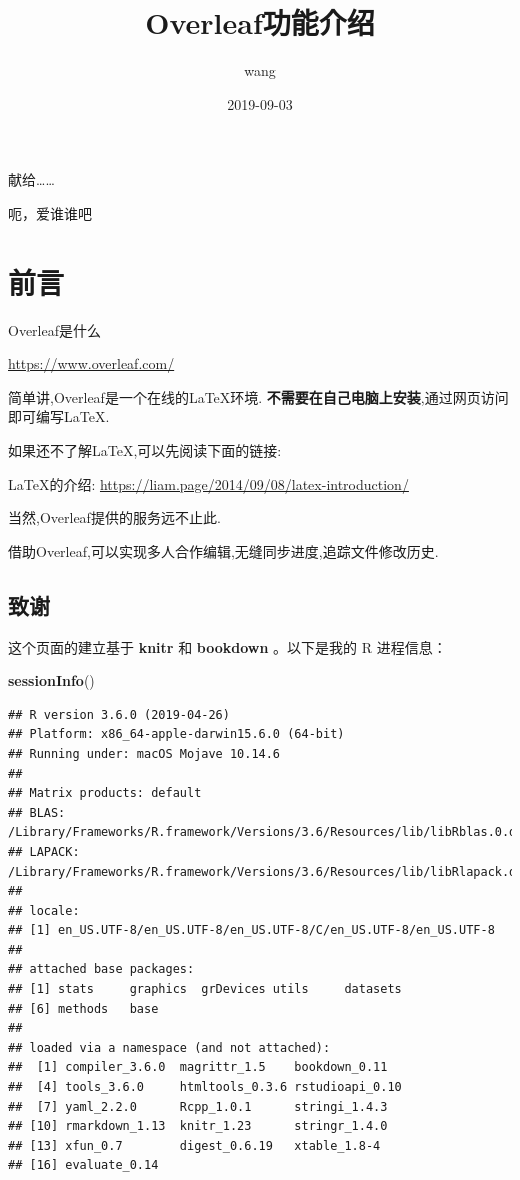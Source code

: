 \documentclass[]{ctexbook}
\title{Overleaf功能介绍}
\author{wang}
\date{2019-09-03}
\newenvironment{Shaded}{\begin{snugshade}}{\end{snugshade}}
\newcommand{\KeywordTok}[1]{\textcolor[rgb]{0.13,0.29,0.53}{\textbf{#1}}}
\newcommand{\NormalTok}[1]{#1}
\begin{document}
\maketitle


\thispagestyle{empty}

\begin{center}
献给……

呃，爱谁谁吧
\end{center}

\setlength{\abovedisplayskip}{-5pt}
\setlength{\abovedisplayshortskip}{-5pt}

{
\setcounter{tocdepth}{2}
\tableofcontents
}
\listoftables
\listoffigures
\hypertarget{section}{%
\chapter*{前言}\label{section}}


Overleaf是什么

\url{https://www.overleaf.com/}

简单讲,Overleaf是一个在线的LaTeX环境.
\textbf{不需要在自己电脑上安装},通过网页访问即可编写LaTeX.

如果还不了解LaTeX,可以先阅读下面的链接:

LaTeX的介绍:
\url{https://liam.page/2014/09/08/latex-introduction/}

当然,Overleaf提供的服务远不止此.

借助Overleaf,可以实现多人合作编辑,无缝同步进度,追踪文件修改历史.

\hypertarget{section-1}{%
\section*{致谢}\label{section-1}}


这个页面的建立基于 \textbf{knitr} \citep{xie2015} 和 \textbf{bookdown} \citep{R-bookdown}。以下是我的 R 进程信息：

\begin{Shaded}
\begin{Highlighting}[]
\KeywordTok{sessionInfo}\NormalTok{()}
\end{Highlighting}
\end{Shaded}

\begin{verbatim}
## R version 3.6.0 (2019-04-26)
## Platform: x86_64-apple-darwin15.6.0 (64-bit)
## Running under: macOS Mojave 10.14.6
## 
## Matrix products: default
## BLAS:   /Library/Frameworks/R.framework/Versions/3.6/Resources/lib/libRblas.0.dylib
## LAPACK: /Library/Frameworks/R.framework/Versions/3.6/Resources/lib/libRlapack.dylib
## 
## locale:
## [1] en_US.UTF-8/en_US.UTF-8/en_US.UTF-8/C/en_US.UTF-8/en_US.UTF-8
## 
## attached base packages:
## [1] stats     graphics  grDevices utils     datasets 
## [6] methods   base     
## 
## loaded via a namespace (and not attached):
##  [1] compiler_3.6.0  magrittr_1.5    bookdown_0.11  
##  [4] tools_3.6.0     htmltools_0.3.6 rstudioapi_0.10
##  [7] yaml_2.2.0      Rcpp_1.0.1      stringi_1.4.3  
## [10] rmarkdown_1.13  knitr_1.23      stringr_1.4.0  
## [13] xfun_0.7        digest_0.6.19   xtable_1.8-4   
## [16] evaluate_0.14
\end{verbatim}
\end{document}
